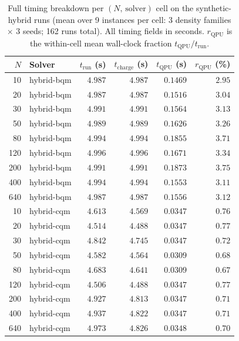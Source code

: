 \begin{table}[ht]
\centering
\caption{Full timing breakdown per $(N,\,\text{solver})$ cell on the synthetic-hybrid runs (mean over 9 instances per cell: 3 density families $\times$ 3 seeds; 162 runs total).  All timing fields in seconds.  $r_{\mathrm{QPU}}$ is the within-cell mean wall-clock fraction $t_{\mathrm{QPU}}/t_{\mathrm{run}}$.}
\label{tab:timing_breakdown}
\begin{tabular}{rlrrrr}
\toprule
$N$ & Solver & $t_{\mathrm{run}}$ (s) & $t_{\mathrm{charge}}$ (s) & $t_{\mathrm{QPU}}$ (s) & $r_{\mathrm{QPU}}$ (\%) \\
\midrule
10 & hybrid-bqm & $4.987$ & $4.987$ & $0.1469$ & $2.95$ \\
20 & hybrid-bqm & $4.987$ & $4.987$ & $0.1516$ & $3.04$ \\
30 & hybrid-bqm & $4.991$ & $4.991$ & $0.1564$ & $3.13$ \\
50 & hybrid-bqm & $4.989$ & $4.989$ & $0.1626$ & $3.26$ \\
80 & hybrid-bqm & $4.994$ & $4.994$ & $0.1855$ & $3.71$ \\
120 & hybrid-bqm & $4.996$ & $4.996$ & $0.1671$ & $3.34$ \\
200 & hybrid-bqm & $4.991$ & $4.991$ & $0.1873$ & $3.75$ \\
400 & hybrid-bqm & $4.994$ & $4.994$ & $0.1553$ & $3.11$ \\
640 & hybrid-bqm & $4.987$ & $4.987$ & $0.1556$ & $3.12$ \\
10 & hybrid-cqm & $4.613$ & $4.569$ & $0.0347$ & $0.76$ \\
20 & hybrid-cqm & $4.514$ & $4.488$ & $0.0347$ & $0.77$ \\
30 & hybrid-cqm & $4.842$ & $4.745$ & $0.0347$ & $0.72$ \\
50 & hybrid-cqm & $4.582$ & $4.564$ & $0.0309$ & $0.68$ \\
80 & hybrid-cqm & $4.683$ & $4.641$ & $0.0309$ & $0.67$ \\
120 & hybrid-cqm & $4.506$ & $4.488$ & $0.0347$ & $0.77$ \\
200 & hybrid-cqm & $4.927$ & $4.813$ & $0.0347$ & $0.71$ \\
400 & hybrid-cqm & $4.937$ & $4.822$ & $0.0347$ & $0.71$ \\
640 & hybrid-cqm & $4.973$ & $4.826$ & $0.0348$ & $0.70$ \\
\bottomrule
\end{tabular}
\end{table}
